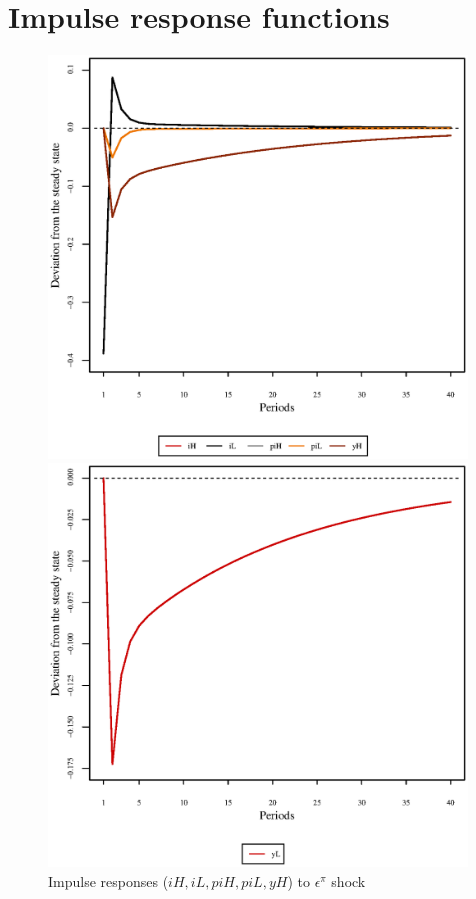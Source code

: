 \pagebreak

\section{Impulse response functions}

\begin{figure}[h]
\begin{minipage}{0.5\textwidth}
\vspace*{-3em}
\centering
\includegraphics[width=0.99\textwidth, scale=0.55]{plots/plot_18.eps}
\caption{Impulse responses (${i\!H}, {i\!L}, {p\!i\!H}, {p\!i\!L}, {y\!H}$) to $\epsilon^{\pi}$ shock}
\end{minipage}
\begin{minipage}{0.5\textwidth}
\vspace*{-3em}
\centering
\includegraphics[width=0.99\textwidth, scale=0.55]{plots/plot_19.eps}

\end{minipage}
\end{figure}
